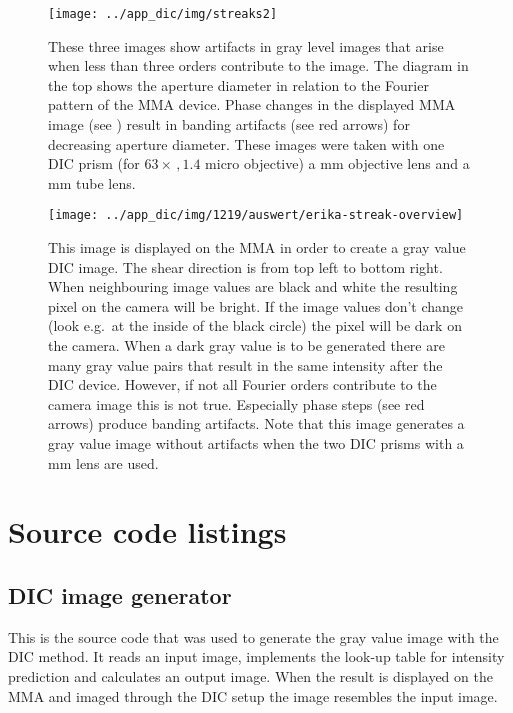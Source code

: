 \begin{figure}[htb]
  \centering
  \texttt{[image: ../app\_dic/img/streaks2]}
  \caption{These three images show artifacts in gray level images that
    arise when less than three orders contribute to the image. The
    diagram in the top shows the aperture diameter in relation to the
    Fourier pattern of the MMA device. Phase changes in the displayed
    MMA image (see ) result in
    banding artifacts (see red arrows) for decreasing aperture
    diameter. These images were taken with one DIC prism (for
    $63\times\,,1.4$ micro objective) a \unit[200]{mm} objective lens
    and a \unit[500]{mm} tube lens.}
  \label{fig:erikas}
\end{figure}

\begin{figure}[p]
  \centering
  \texttt{[image: ../app\_dic/img/1219/auswert/erika-streak-overview]}
  \caption{This image is displayed on the MMA in order to create a
    gray value DIC image. The shear direction is from top left to
    bottom right. When neighbouring image values are black and white
    the resulting pixel on the camera will be bright. If the image
    values don't change (look e.g.\ at the inside of the black circle)
    the pixel will be dark on the camera. When a dark gray value is to
    be generated there are many gray value pairs that result in the
    same intensity after the DIC device. However, if not all Fourier
    orders contribute to the camera image this is not true. Especially
    phase steps (see red arrows) produce banding artifacts. Note that
    this image generates a gray value image without artifacts when the
    two DIC prisms with a \unit[100]{mm} lens are used.}
  \label{fig:erika-streak-overview}
\end{figure}
\section{Source code listings}
\subsection{DIC image generator}
\label{sec:source}
This is the source code that was used to generate the gray value image
with the DIC method. It reads an input image, implements the look-up
table for intensity prediction and calculates an output image. When
the result is displayed on the MMA and imaged through the DIC setup
the image resembles the input image.
% 
